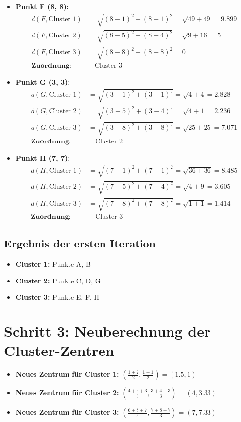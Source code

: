 \documentclass{article}
\begin{document}
\begin{itemize}
    \item \textbf{Punkt F (8, 8):}
    \begin{align*}
    d(F, \text{Cluster 1}) &= \sqrt{(8-1)^2 + (8-1)^2} = \sqrt{49 + 49} = 9.899 \\
    d(F, \text{Cluster 2}) &= \sqrt{(8-5)^2 + (8-4)^2} = \sqrt{9 + 16} = 5 \\
    d(F, \text{Cluster 3}) &= \sqrt{(8-8)^2 + (8-8)^2} = 0 \\
    \textbf{Zuordnung:} & \quad \text{Cluster 3}
    \end{align*}
    
    \item \textbf{Punkt G (3, 3):}
    \begin{align*}
    d(G, \text{Cluster 1}) &= \sqrt{(3-1)^2 + (3-1)^2} = \sqrt{4 + 4} = 2.828 \\
    d(G, \text{Cluster 2}) &= \sqrt{(3-5)^2 + (3-4)^2} = \sqrt{4 + 1} = 2.236 \\
    d(G, \text{Cluster 3}) &= \sqrt{(3-8)^2 + (3-8)^2} = \sqrt{25 + 25} = 7.071 \\
    \textbf{Zuordnung:} & \quad \text{Cluster 2}
    \end{align*}
    
    \item \textbf{Punkt H (7, 7):}
    \begin{align*}
    d(H, \text{Cluster 1}) &= \sqrt{(7-1)^2 + (7-1)^2} = \sqrt{36 + 36} = 8.485 \\
    d(H, \text{Cluster 2}) &= \sqrt{(7-5)^2 + (7-4)^2} = \sqrt{4 + 9} = 3.605 \\
    d(H, \text{Cluster 3}) &= \sqrt{(7-8)^2 + (7-8)^2} = \sqrt{1 + 1} = 1.414 \\
    \textbf{Zuordnung:} & \quad \text{Cluster 3}
    \end{align*}
\end{itemize}

\subsection*{Ergebnis der ersten Iteration}
\begin{itemize}
    \item \textbf{Cluster 1:} Punkte A, B
    \item \textbf{Cluster 2:} Punkte C, D, G
    \item \textbf{Cluster 3:} Punkte E, F, H
\end{itemize}

\section*{Schritt 3: Neuberechnung der Cluster-Zentren}
\begin{itemize}
    \item \textbf{Neues Zentrum für Cluster 1:} \((\frac{1+2}{2}, \frac{1+1}{2}) = (1.5, 1)\)
    \item \textbf{Neues Zentrum für Cluster 2:} \((\frac{4+5+3}{3}, \frac{3+4+3}{3}) = (4, 3.33)\)
    \item \textbf{Neues Zentrum für Cluster 3:} \((\frac{6+8+7}{3}, \frac{7+8+7}{3}) = (7, 7.33)\)
\end{itemize}
\end{document}

